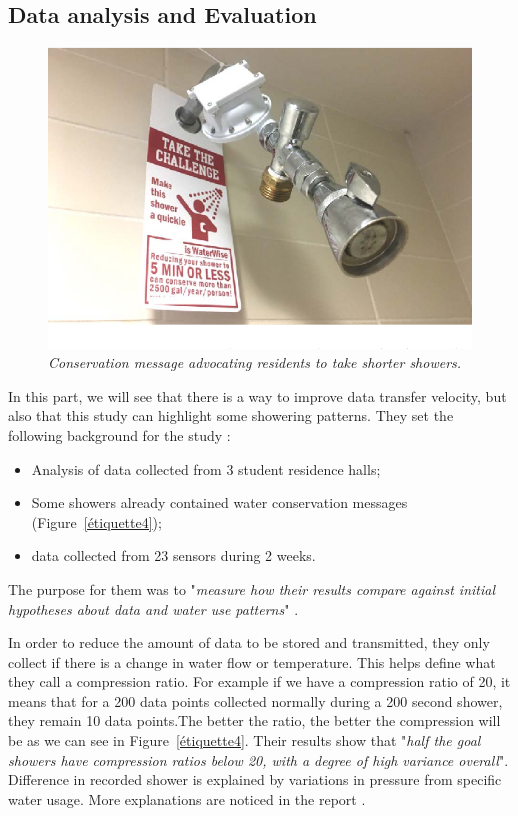 \documentclass[10pt,journal,compsoc]{IEEEtran}
\begin{document}
\subsection{Data analysis and Evaluation}
\begin{center}
    \begin{figure}[!t]
        \includegraphics[scale=0.4]{water-message.png}
        \caption{\label{étiquette3} \emph{ Conservation message advocating residents to take shorter showers.} \cite{IEEEhowto:}}
    \end{figure}

\end{center}
In this part, we will see that there is a way to improve data transfer velocity, but also that this study can highlight some showering patterns. They set the following background for the study : 
\begin{itemize}
    \item Analysis of data collected from 3 student residence halls;
    \item Some showers already contained water conservation messages (Figure~\ref{étiquette4});
    \item data collected from 23 sensors during 2 weeks.
\end{itemize}
The purpose for them was to "\emph{measure how their results compare against initial hypotheses about data and water use patterns}" \cite{IEEEhowto:}.

In order to reduce the amount of data to be stored and transmitted, they only collect if there is a change in water flow or temperature. This helps define what they call a compression ratio. For example if we have a compression ratio of 20, it means that for a 200 data points collected normally during a 200 second shower, they remain 10 data points.The better the ratio, the better the compression will be as we can see in Figure~\ref{étiquette4}. Their results show that "\emph{half the goal showers have compression ratios below 20, with a degree of high variance overall}"\cite{IEEEhowto:}. Difference in recorded shower is explained by variations in pressure from specific water usage. More explanations are noticed in the report \cite{IEEEhowto:}.
\end{document}
